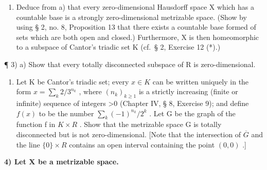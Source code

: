 \begin{enumerate}
\def\labelenumi{\alph{enumi})}
\setcounter{enumi}{1}
\tightlist
\item
  Deduce from a) that every zero-dimensional Hausdorff space X which has a countable base is a strongly zero-dimensional metrizable space. (Show by using § 2, no. 8, Proposition 13 that there exists a countable base formed of sets which are both open and closed.) Furthermore, X is then homeomorphic to a subspace of Cantor's triadic set K (cf.~§ 2, Exercise 12 (*).)
\end{enumerate}

¶ 3) a) Show that every totally disconnected subspace of R is zero-dimensional.

\begin{enumerate}
\def\labelenumi{\alph{enumi})}
\setcounter{enumi}{1}
\tightlist
\item
  Let K be Cantor's triadic set; every \(x \in K\) can be written uniquely in the form \(x = \sum_{k} 2/3^{n_k}\) , where \((n_k)_{k \geqslant 1}\) is a strictly increasing (finite or infinite) sequence of integers \textgreater0 (Chapter IV, § 8, Exercise 9); and define \(f(x)\) to be the number \(\sum_{k} (-1)^{n_k}/2^k\) . Let G be the graph of the function f in \(K \times R\) . Show that the metrizable space G is totally disconnected but is not zero-dimensional. {[}Note that the intersection of \(\overline{G}\) and the line \(\{0\} \times R\) contains an open interval containing the point \((0, 0)\) .{]}
\end{enumerate}

\par\noindent\textbf{4) Let \(\mathbf{X}\) be a metrizable space.}\par

